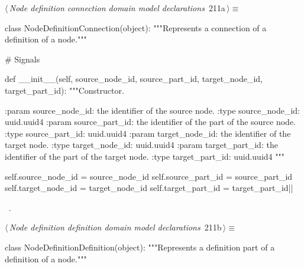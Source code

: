 \documentclass[%
    a4paper,    %
    justified,  %
    nobib,      %
    openany     %
]{tufte-book}
\makeatletter
\renewcommand{\label}[1]{\@tufte@label{##1}}%
\makeatother
\begin{document}
\begin{fullwidth}
\begin{flushleft}
\begin{minipage}{\linewidth}
\begin{list}{}{\setlength{\itemsep}{-\parsep}\setlength{\itemindent}{-\leftmargin}}
\item{}
\end{list}
\end{minipage}\vspace{4ex}
\end{flushleft}
\begin{flushleft} \small
\begin{minipage}{\linewidth}\label{scrap210}\raggedright\small
{} $\langle\,${\itshape Node definition connection domain model declarations}\nobreak\ {\footnotesize {211a}}$\,\rangle\equiv$
\vspace{-1ex}
\begin{pythoncode}
class NodeDefinitionConnection(object):
    """Represents a connection of a definition of a node."""

    # Signals

    def __init__(self,
                 source_node_id, source_part_id,
                 target_node_id, target_part_id):
        """Constructor.

        :param source_node_id: the identifier of the source node.
        :type  source_node_id: uuid.uuid4
        :param source_part_id: the identifier of the part of the source node.
        :type  source_part_id: uuid.uuid4
        :param target_node_id: the identifier of the target node.
        :type  target_node_id: uuid.uuid4
        :param target_part_id: the identifier of the part of the target node.
        :type  target_part_id: uuid.uuid4
        """

        self.source_node_id = source_node_id
        self.source_part_id = source_part_id
        self.target_node_id = target_node_id
        self.target_part_id = target_part_id|\NWsep|
\end{pythoncode}
\vspace{1.5ex}
\footnotesize
\begin{list}{}{\setlength{\itemsep}{-\parsep}\setlength{\itemindent}{-\leftmargin}}
\item \NWtxtMacroRefIn\ .

\item{}
\end{list}
\end{minipage}\vspace{4ex}
\end{flushleft}
\begin{flushleft} \small
\begin{minipage}{\linewidth}\label{scrap211}\raggedright\small
{} $\langle\,${\itshape Node definition definition domain model declarations}\nobreak\ {\footnotesize {211b}}$\,\rangle\equiv$
\vspace{-1ex}
\begin{pythoncode}
class NodeDefinitionDefinition(object):
    """Represents a definition part of a definition of a node."""


\end{pythoncode}
\end{minipage}
\end{flushleft}
\end{fullwidth}
\end{document}
